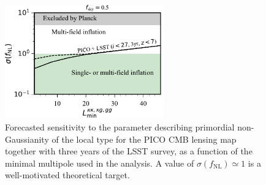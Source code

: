 \documentclass[PICOReport.tex]{subfiles}
\begin{document}
\begin{figure}
\hspace{-0.in}
\parbox{3.1in}{\centerline {
\includegraphics[width=2.7in]{images/PICO_fnl_lmin_PICOv4.1b_deproj0_SENS0.pdf} } }
\hspace{0.in}
\parbox{3.3in}{
\caption{\label{fig:fnlconstraint} Forecasted sensitivity to  the parameter describing primordial non-Gaussianity of the local type for the PICO CMB lensing map together with three years of the LSST survey, as a function of the minimal multipole used in the analysis. A value of $\sigma (f_\mathrm{NL}) \simeq 1$ is a well-motivated theoretical target.  } }
\vspace{-0.1in}
\end{figure}

\end{document}
